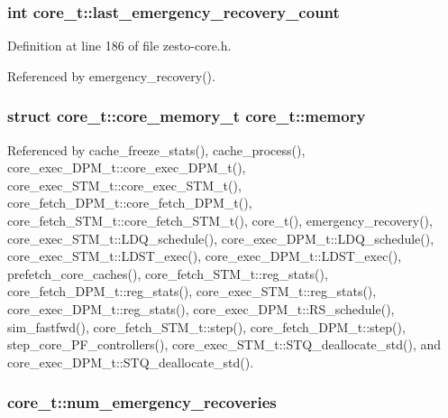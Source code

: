 \subsubsection[{last\_\-emergency\_\-recovery\_\-count}]{\setlength{\rightskip}{0pt plus 5cm}int {\bf core\_\-t::last\_\-emergency\_\-recovery\_\-count}}\label{classcore__t_11034d8bb95a7d541a7a0d5efdaded9a}




Definition at line 186 of file zesto-core.h.

Referenced by emergency\_\-recovery().
\subsubsection[{memory}]{\setlength{\rightskip}{0pt plus 5cm}struct {\bf core\_\-t::core\_\-memory\_\-t}  {\bf core\_\-t::memory}}\label{classcore__t_05317565ca33e18c2eb9b8fa9a950ce1}




Referenced by cache\_\-freeze\_\-stats(), cache\_\-process(), core\_\-exec\_\-DPM\_\-t::core\_\-exec\_\-DPM\_\-t(), core\_\-exec\_\-STM\_\-t::core\_\-exec\_\-STM\_\-t(), core\_\-fetch\_\-DPM\_\-t::core\_\-fetch\_\-DPM\_\-t(), core\_\-fetch\_\-STM\_\-t::core\_\-fetch\_\-STM\_\-t(), core\_\-t(), emergency\_\-recovery(), core\_\-exec\_\-STM\_\-t::LDQ\_\-schedule(), core\_\-exec\_\-DPM\_\-t::LDQ\_\-schedule(), core\_\-exec\_\-STM\_\-t::LDST\_\-exec(), core\_\-exec\_\-DPM\_\-t::LDST\_\-exec(), prefetch\_\-core\_\-caches(), core\_\-fetch\_\-STM\_\-t::reg\_\-stats(), core\_\-fetch\_\-DPM\_\-t::reg\_\-stats(), core\_\-exec\_\-STM\_\-t::reg\_\-stats(), core\_\-exec\_\-DPM\_\-t::reg\_\-stats(), core\_\-exec\_\-DPM\_\-t::RS\_\-schedule(), sim\_\-fastfwd(), core\_\-fetch\_\-STM\_\-t::step(), core\_\-fetch\_\-DPM\_\-t::step(), step\_\-core\_\-PF\_\-controllers(), core\_\-exec\_\-STM\_\-t::STQ\_\-deallocate\_\-std(), and core\_\-exec\_\-DPM\_\-t::STQ\_\-deallocate\_\-std().
\subsubsection[{num\_\-emergency\_\-recoveries}]{ {\bf core\_\-t::num\_\-emergency\_\-recoveries}}\label{classcore__t_ad184ce68308f37e1fb07a5eab624314}




